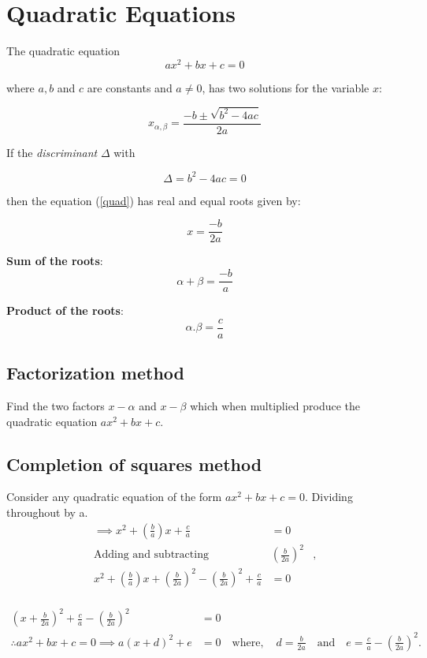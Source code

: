 \section{Quadratic Equations}

The quadratic equation 
\begin{equation}
\label{quad}
ax^2+bx+c = 0
\end{equation}

where \(a,b\) and \(c\) are constants and \(a \neq 0\), has two solutions for the variable \(x\):

\begin{equation}
\label{root}
x_{\alpha,\beta} = \frac{-b \pm \sqrt{b^2 - 4ac}}{2a}
\end{equation}

If the \emph{discriminant} \( \Delta \) with 

\begin{equation}
\label{delta}
\Delta = b^2 - 4ac = 0
\end{equation}

then the equation (\ref{quad}) has real and equal roots given by:

\begin{equation}
\label{equal_root}
x = \frac{-b}{2a}
\end{equation}

\textbf{Sum of the roots}:
\begin{equation}
\label{sum_root}
\alpha + \beta = \frac{-b}{a}
\end{equation}

\textbf{Product of the roots}:
\begin{equation}
\label{product_root}
\alpha.\beta = \frac{c}{a}
\end{equation}

\subsection{Factorization method}
Find the two factors $x-\alpha$ and $x-\beta$ which when multiplied produce the quadratic equation $ax^2+bx+c$. 

\subsection{Completion of squares method}
Consider any quadratic equation of the form $ax^2+bx+c = 0$. Dividing throughout by a.
\begin{align*}
\implies x^2+ \left(\frac{b}{a}\right) x +\frac{c}{a} &=0\\
\text{Adding and subtracting} &\left(\frac{b}{2a}\right)^{2}&,\\
x^2 + \left(\frac{b}{a}\right)x + \left(\frac{b}{2a}\right)^{2} - \left(\frac{b}{2a}\right)^{2} + \frac{c}{a} &=0\\
\end{align*}

\begin{align*}
\left(x + \frac{b}{2a} \right)^{2} + \frac{c}{a} - \left(\frac{b}{2a}\right)^{2} &=0\\
\therefore ax^2+bx+c = 0 \implies a(x+d)^{2} + e &=0 \quad \text{where},\quad
d =\frac{b}{2a} \quad \text{and} \quad e = \frac{c}{a} - \left(\frac{b}{2a}\right)^{2}.
\end{align*}